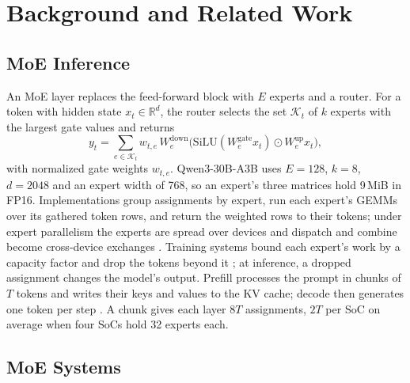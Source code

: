 \section{Background and Related Work}
\label{sec:bg}

\subsection{MoE Inference}

An MoE layer replaces the feed-forward block with $E$ experts and a router. For a token with hidden state
$x_t\in\mathbb{R}^d$, the router selects the set $\mathcal{K}_t$ of $k$ experts with the largest gate values and returns
\begin{equation}
y_t=\sum_{e\in\mathcal{K}_t} w_{t,e}\,W^{\mathrm{down}}_e\big(\mathrm{SiLU}(W^{\mathrm{gate}}_e x_t)\odot W^{\mathrm{up}}_e x_t\big),
\label{eq:moe}
\end{equation}
with normalized gate weights $w_{t,e}$. Qwen3-30B-A3B uses $E=128$, $k=8$, $d=2048$ and an expert width of 768, so an
expert's three matrices hold 9\,MiB in FP16. Implementations group assignments by expert, run each expert's GEMMs over
its gathered token rows, and return the weighted rows to their tokens; under expert parallelism the experts are spread
over devices and dispatch and combine become cross-device exchanges \citep{lepikhin2021gshard,rajbhandari2022deepspeedmoe}.
Training systems bound each expert's work by a capacity factor and drop the tokens beyond it
\citep{lepikhin2021gshard,fedus2022switch}; at inference, a dropped assignment changes the model's output. Prefill
processes the prompt in chunks of $T$ tokens and writes their keys and values to the KV cache; decode then generates one
token per step \citep{kwon2023vllm,agrawal2024sarathi}. A chunk gives each layer $8T$ assignments, $2T$ per SoC on average
when four SoCs hold 32 experts each.

\subsection{MoE Systems}

